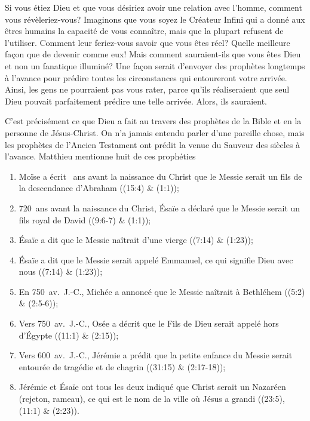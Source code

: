 

Si vous étiez Dieu et que vous désiriez avoir une relation avec l'homme, comment vous révèleriez-vous? Imaginons que vous soyez le Créateur Infini qui a donné aux êtres humains la capacité de vous connaître, mais que la plupart refusent de l'utiliser. Comment leur feriez-vous savoir que vous êtes réel? Quelle meilleure façon que de devenir comme eux! Mais comment sauraient-ils que vous êtes Dieu et non un fanatique illuminé? Une façon serait d'envoyer des prophètes longtemps à l'avance pour prédire toutes les circonstances qui entoureront votre arrivée. Ainsi, les gens ne pourraient pas vous rater, parce qu'ils réaliseraient que seul Dieu pouvait parfaitement prédire une telle arrivée. Alors, ils sauraient.

C'est précisément ce que Dieu a fait au travers des prophètes de la Bible et en la personne de Jésus-Christ. On n'a jamais entendu parler d'une pareille chose, mais les prophètes de l'Ancien Testament ont prédit la venue du Sauveur des siècles à l'avance. Matthieu mentionne huit de ces prophéties\frcolon{}

\begin{enumerate}
        \item Moïse a écrit ~ans avant la naissance du Christ que le Messie serait un fils de la descendance d'Abraham ((15:4) \& (1:1));
        \item 720~ans avant la naissance du Christ, Ésaïe a déclaré que le Messie serait un fils royal de David ((9:6-7) \& (1:1));
        \item Ésaïe a dit que le Messie naîtrait d'une vierge ((7:14) \& (1:23));
        \item Ésaïe a dit que le Messie serait appelé Emmanuel, ce qui signifie \Og Dieu avec nous \Fg{} ((7:14) \& (1:23));
        \item En 750~av.~J.-C., Michée a annoncé que le Messie naîtrait à Bethléhem ((5:2) \& (2:5-6));
        \item Vers 750~av.~J.-C., Osée a décrit que le Fils de Dieu serait appelé hors d'Égypte ((11:1) \& (2:15));
        \item Vers 600~av.~J.-C., Jérémie a prédit que la petite enfance du Messie serait entourée de tragédie et de chagrin ((31:15) \& (2:17-18));
        \item Jérémie et Ésaïe ont tous les deux indiqué que Christ serait un Nazaréen (rejeton, rameau), ce qui est le nom de la ville où Jésus a grandi ((23:5), (11:1) \& (2:23)).
\end{enumerate}

